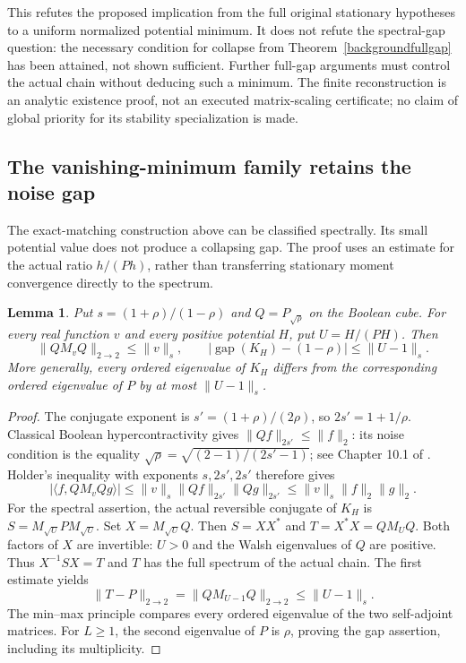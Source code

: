 \documentclass[11pt]{article}
\newtheorem{lemma}[theorem]{Lemma}
\begin{document}
This refutes the proposed implication from the full original stationary
hypotheses to a uniform normalized potential minimum. It does not
refute the spectral-gap question: the necessary condition for collapse
from Theorem~\ref{backgroundfullgap} has been attained, not shown
sufficient. Further full-gap arguments must control the actual chain
without deducing such a minimum. The finite reconstruction is an
analytic existence proof, not an executed matrix-scaling certificate;
no claim of global priority for its stability specialization is made.

\subsection{The vanishing-minimum family retains the noise gap}
The exact-matching construction above can be classified spectrally.
Its small potential value does not produce a collapsing gap. The proof
uses an estimate for the actual ratio $h/(Ph)$, rather than transferring
stationary moment convergence directly to the spectrum.

\begin{lemma}\label{criticalsandwich}
Put $s=(1+\rho)/(1-\rho)$ and $Q=P_{\sqrt\rho}$ on the Boolean cube.
For every real function $v$ and every positive potential $H$, put
$U=H/(PH)$. Then
\[
 \|QM_vQ\|_{2\to2}\leq\|v\|_s,
 \qquad
 |\operatorname{gap}(K_H)-(1-\rho)|\leq\|U-1\|_s.
\]
More generally, every ordered eigenvalue of $K_H$ differs from the
corresponding ordered eigenvalue of $P$ by at most $\|U-1\|_s$.
\end{lemma}
\begin{proof}
The conjugate exponent is $s'=(1+\rho)/(2\rho)$, so
$2s'=1+1/\rho$. Classical Boolean hypercontractivity gives
$\|Qf\|_{2s'}\leq\|f\|_2$: its noise condition is the equality
$\sqrt\rho=\sqrt{(2-1)/(2s'-1)}$; see Chapter 10.1 of
\cite{odonnell}. Holder's inequality with exponents $s,2s',2s'$
therefore gives
\[
 |\langle f,QM_vQg\rangle|
 \leq\|v\|_s\|Qf\|_{2s'}\|Qg\|_{2s'}
 \leq\|v\|_s\|f\|_2\|g\|_2.
\]
For the spectral assertion, the actual reversible conjugate of $K_H$
is $S=M_{\sqrt U}PM_{\sqrt U}$. Set $X=M_{\sqrt U}Q$.
Then $S=XX^*$ and $T=X^*X=QM_UQ$. Both factors of $X$ are
invertible: $U>0$ and the Walsh eigenvalues of $Q$ are positive.
Thus $X^{-1}SX=T$ and $T$ has the full spectrum of the actual chain.
The first estimate yields
\[
 \|T-P\|_{2\to2}=\|QM_{U-1}Q\|_{2\to2}\leq\|U-1\|_s.
\]
The min--max principle compares every ordered eigenvalue of the two
self-adjoint matrices. For $L\geq1$, the second eigenvalue of $P$
is $\rho$, proving the gap assertion, including its multiplicity.
\end{proof}
\end{document}
